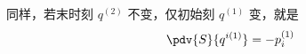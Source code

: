 同样，若末时刻 $q^{(2)}$ 不变，仅初始刻 $q^{(1)}$ 变，就是
\begin{equation}
\pdv{S}{{q}^{i (1)}}=-p_i^{(1)}
\end{equation}



